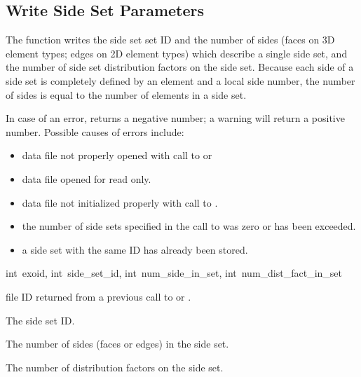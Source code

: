 \subsection{Write Side Set Parameters}

The function  writes the side set set
ID and the number of sides (faces on 3D element types; edges on 2D
element types) which describe a single side set, and the number of
side set distribution factors on the side set. Because each side of a
side set is completely defined by an element and a local side number,
the number of sides is equal to the number of elements in a side set.

In case of an error,  returns a
negative number; a warning will return a positive number. Possible
causes of errors include:

\begin{itemize}
 \item data file not properly opened with call to 
 or 

 \item data file opened for read only.

 \item data file not initialized properly with call to
 .

 \item the number of side sets specified in the call to
  was zero or has been exceeded.

 \item a side set with the same ID has already been stored.
\end{itemize}


{int~exoid, 
int~side_set_id, 
int~num_side_in_set, 
int~num_dist_fact_in_set}

\begin{parameters}
\item[{int} {exoid \R{}}]
\exo{} file ID returned from a previous call to  
or .

\item[{int side_set_id} {\R{}}]
The side set ID.

\item[{int num_side_in_set} {\R{}}]
The number of sides (faces or edges) in the side set.

\item[{int num_dist_fact_in_set} {\R{}}]
The number of distribution factors on the side set.
\end{parameters}

